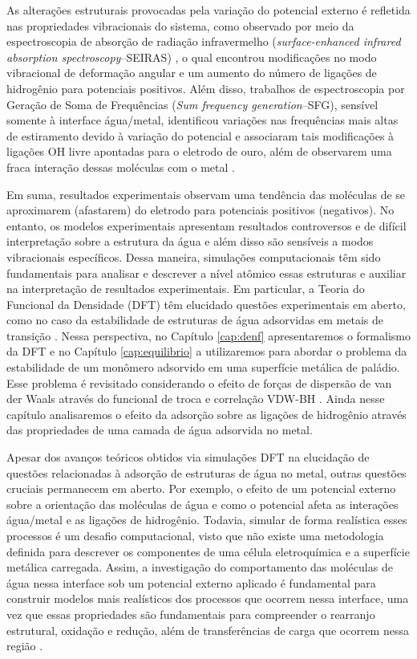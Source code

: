 As alterações estruturais provocadas pela variação do potencial externo é refletida nas propriedades vibracionais do sistema, como observado por meio da espectroscopia de absorção de radiação infravermelho (\textit{surface-enhanced infrared absorption spectroscopy}--SEIRAS) \cite{raman1}, o qual encontrou modificações no modo vibracional de deformação angular e um aumento do número de ligações de hidrogênio para potenciais positivos. Além disso, trabalhos de espectroscopia por Geração de Soma de Frequências (\textit{Sum frequency generation}--SFG), sensível somente à interface água/metal, identificou variações nas frequências mais altas de estiramento devido à variação do potencial e associaram tais modificações à ligações OH livre apontadas para o eletrodo de ouro, além de observarem uma fraca interação dessas moléculas com o metal \cite{sfg1,sfg2,sfg_kramer}. 


Em suma, resultados experimentais observam uma tendência das moléculas de se aproximarem (afastarem) do eletrodo para potenciais positivos (negativos). No entanto, os modelos experimentais apresentam resultados controversos e de difícil interpretação sobre a estrutura da água e além disso são sensíveis a modos vibracionais específicos. Dessa maneira, simulações computacionais têm sido fundamentais para analisar e descrever a nível atômico essas estruturas e auxiliar na interpretação de resultados experimentais. Em particular, a Teoria do Funcional da Densidade (DFT) têm elucidado questões experimentais em aberto, como no caso da estabilidade de estruturas de água adsorvidas em metais de transição \cite{michaedelis,monomer}. Nessa perspectiva, no Capítulo \ref{cap:denf} apresentaremos o formalismo da DFT e no Capítulo \ref{cap:equilibrio} a utilizaremos para abordar o problema da estabilidade de um monômero adsorvido em uma superfície metálica de paládio. Esse problema é revisitado  considerando o efeito de forças de dispersão de van der Waals através do funcional de troca e correlação VDW-BH \cite{vdw-bh}. Ainda nesse capítulo analisaremos o efeito da adsorção sobre as ligações de hidrogênio através das propriedades de uma camada de água adsorvida no metal. 


Apesar dos avanços teóricos obtidos via simulações DFT na elucidação de questões relacionadas à adsorção de estruturas de água no metal, outras questões cruciais permanecem em aberto. Por exemplo, o efeito de um potencial externo sobre a orientação das moléculas de água e como o potencial afeta as interações água/metal e as ligações de hidrogênio. Todavia, simular de forma realística esses processos é um desafio computacional, visto que não existe uma metodologia definida para descrever os componentes de uma célula eletroquímica e a superfície metálica carregada. Assim, a investigação do comportamento das moléculas de água nessa interface sob um potencial externo aplicado é fundamental para construir modelos mais realísticos dos processos que ocorrem nessa interface, uma vez que essas propriedades são fundamentais para compreender o rearranjo estrutural, oxidação e redução, além de transferências de carga que ocorrem nessa região \cite{electro_curcinotta,bias_agua1}.

